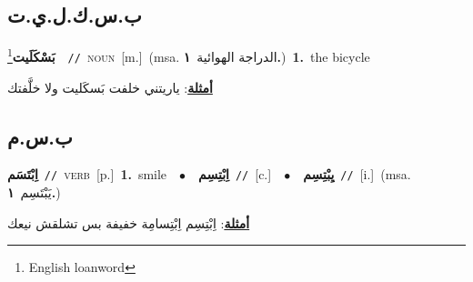 \documentclass[10pt,a4paper,twoside]{article} %
\begin{document}
\begin{multicols}{2}
\vspace{-3mm}
\subsection*{\color{blue}\foreignlanguage{arabic}{ب.س.ك.ل.ي.ت}\color{blue}{ (ntws)}} 

{\setlength\topsep{0pt}\textbf{\foreignlanguage{arabic}{بَسْكَلَيت}}\footnote{English loanword}\ \ {\color{gray}\texttt{//}\color{black}}\ \textsc{noun}\ [m.]\ \color{gray}(msa. \foreignlanguage{arabic}{الدراجة الهوائية}~\foreignlanguage{arabic}{\textbf{١.}})\color{black}\ \textbf{1.}~the bicycle\  \begin{flushright}\color{gray}\foreignlanguage{arabic}{\textbf{\underline{\foreignlanguage{arabic}{أمثلة}}}: ياريتني خلفت بَسكَليت  ولا خلَّفتك}\end{flushright}\color{black}} \vspace{2mm}

\vspace{-3mm}
\subsection*{\color{blue}\foreignlanguage{arabic}{ب.س.م}\color{blue}{}} 

{\setlength\topsep{0pt}\textbf{\foreignlanguage{arabic}{اِبْتَسَم}}\ {\color{gray}\texttt{//}\color{black}}\ \textsc{verb}\ [p.]\ \textbf{1.}~smile\ \ $\bullet$\ \ \setlength\topsep{0pt}\textbf{\foreignlanguage{arabic}{اِبْتِسِم}}\ {\color{gray}\texttt{//}\color{black}}\ [c.]\ \ $\bullet$\ \ \setlength\topsep{0pt}\textbf{\foreignlanguage{arabic}{يِبْتِسِم}}\ {\color{gray}\texttt{//}\color{black}}\ [i.]\ \color{gray}(msa. \foreignlanguage{arabic}{يَبْتَسِم}~\foreignlanguage{arabic}{\textbf{١.}})\color{black}\  \begin{flushright}\color{gray}\foreignlanguage{arabic}{\textbf{\underline{\foreignlanguage{arabic}{أمثلة}}}: اِبْتِسِم اِبْتِسامِة خفيفة بس تشلقش نيعك}\end{flushright}\color{black}} \vspace{2mm}


\end{multicols}
\end{document}
